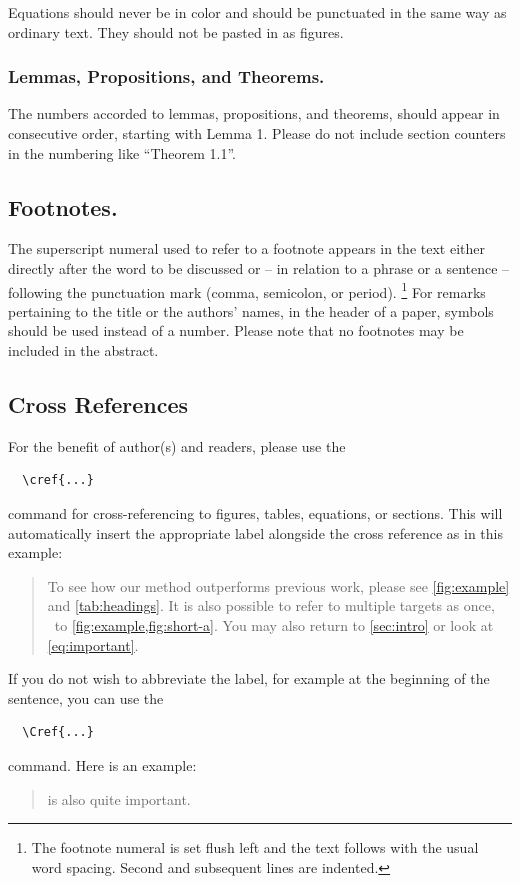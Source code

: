 \documentclass[runningheads]{llncs}
\begin{document}
Equations should never be in color and should be punctuated in the same way as ordinary text.
They should not be pasted in as figures.


\subsubsection{Lemmas, Propositions, and Theorems.}
The numbers accorded to lemmas, propositions, and theorems, \etc should appear in consecutive order, starting with Lemma 1. 
Please do not include section counters in the numbering like ``Theorem 1.1''.


\subsection{Footnotes.}
The superscript numeral used to refer to a footnote appears in the text either directly after the word to be discussed or -- in relation to a phrase or a sentence -- following the punctuation mark (comma, semicolon, or period).%
\footnote{The footnote numeral is set flush left and the text follows with the usual word spacing. 
  Second and subsequent lines are indented. 
}
For remarks pertaining to the title or the authors' names, in the header of a paper, symbols should be used instead of a number.
Please note that no footnotes may be included in the abstract.


\subsection{Cross References}
For the benefit of author(s) and readers, please use the
\begin{verbatim}
  \cref{...}
\end{verbatim}
command for cross-referencing to figures, tables, equations, or sections.
This will automatically insert the appropriate label alongside the cross reference as in this example:
\begin{quotation}
  To see how our method outperforms previous work, please see \cref{fig:example} and \cref{tab:headings}.
  It is also possible to refer to multiple targets as once, \eg~to \cref{fig:example,fig:short-a}.
  You may also return to \cref{sec:intro} or look at \cref{eq:important}.
\end{quotation}
If you do not wish to abbreviate the label, for example at the beginning of the sentence, you can use the
\begin{verbatim}
  \Cref{...}
\end{verbatim}
command. Here is an example:
\begin{quotation}
   is also quite important.
\end{quotation}
\end{document}
